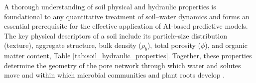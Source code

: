 \documentclass[land,article,submit,pdftex,moreauthors]{Definitions/mdpi}
\numberwithin{equation}{section}
\begin{document}
A thorough understanding of soil physical and hydraulic properties is foundational to any quantitative treatment of soil--water dynamics and forms an essential prerequisite for the effective application of AI-based predictive models. The key physical descriptors of a soil include its particle-size distribution (texture), aggregate structure, bulk density ($\rho_b$), total porosity ($\phi$), and organic matter content, Table \ref{tab:soil_hydraulic_properties}. Together, these properties determine the geometry of the pore network through which water and solutes move and within which microbial communities and plant roots develop \citep{hillel2004, Lemenkova202318, HILLEL2003407, Lemenkova202224}.

\footnotesize
\setlength{\LTleft}{0pt}
\setlength{\LTright}{0pt}
\end{document}

